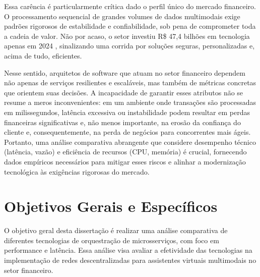 Essa carência é particularmente crítica dado o perfil único do mercado financeiro. O processamento sequencial de grandes volumes de dados multimodais exige padrões rigorosos de estabilidade e confiabilidade, sob pena de comprometer toda a cadeia de valor. Não por acaso, o setor investiu R\$ 47,4 bilhões em tecnologia apenas em 2024 \cite{febraban-federacao_brasileira_de_bancos_pesquisa_nodate, arditti_microsservicos_2025}, sinalizando uma corrida por soluções seguras, personalizadas e, acima de tudo, eficientes.

Nesse sentido, arquitetos de software que atuam no setor financeiro dependem não apenas de serviços resilientes e escaláveis, mas também de métricas concretas que orientem suas decisões. A incapacidade de garantir esses atributos não se resume a meros inconvenientes: em um ambiente onde transações são processadas em milissegundos, latência excessiva ou instabilidade podem resultar em perdas financeiras significativas e, não menos importante, na erosão da confiança do cliente e, consequentemente, na perda de negócios para concorrentes mais ágeis. Portanto, uma análise comparativa abrangente que considere desempenho técnico (latência, vazão) e eficiência de recursos (CPU, memória) é crucial, fornecendo dados empíricos necessários para mitigar esses riscos e alinhar a modernização tecnológica às exigências rigorosas do mercado.

\section{Objetivos Gerais e Específicos}

O objetivo geral desta dissertação é realizar uma análise comparativa de diferentes tecnologias de orquestração de microsserviços, com foco em performance e latência. Essa análise visa avaliar a efetividade das tecnologias na implementação de redes descentralizadas para assistentes virtuais multimodais no setor financeiro.

